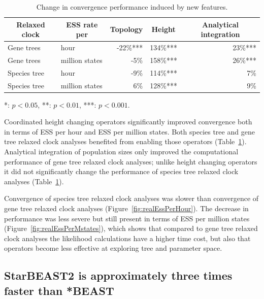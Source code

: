 \documentclass[12pt]{article}
\begin{document}
\begin{table}[htb!]
\centering
\caption{Change in convergence performance induced by new features.}
\label{tab:convergenceLM}
\begin{threeparttable}
\begin{adjustbox}{center}
\begin{tabular}{|l|l|r|r|r|}
\hline
\multicolumn{1}{|c|}{Relaxed clock} & \multicolumn{1}{c|}{ESS rate per} & \multicolumn{1}{c|}{Topology} & \multicolumn{1}{c|}{Height} & \multicolumn{1}{c|}{Analytical integration}\tabularnewline
\hline
Gene trees & hour & -22\%{***} & 134\%{***} & 23\%{***}\tabularnewline
\hline
Gene trees & million states & -5\%\hphantom{***} & 158\%{***} & 26\%{***}\tabularnewline
\hline
Species tree & hour & -9\%\hphantom{***} & 114\%{***} & 7\%\hphantom{***}\tabularnewline
\hline
Species tree & million states & 6\%\hphantom{***} & 128\%{***} & 9\%\hphantom{***}\tabularnewline
\hline
\end{tabular}
\end{adjustbox}
\begin{tablenotes}
\small
\item \hspace{1cm} {*}: $p < 0.05$, {**}: $p < 0.01$, {***}: $p < 0.001$.
\end{tablenotes}
\end{threeparttable}
\end{table}

Coordinated height changing operators significantly improved convergence both in
terms of ESS per hour and ESS per million states. Both species tree and gene
tree relaxed clock analyses benefited from enabling those operators
(Table~\ref{tab:convergenceLM}). Analytical integration of population sizes only
improved the computational performance of gene tree relaxed clock analyses;
unlike height changing operators it did not significantly change the performance
of species tree relaxed clock analyses (Table~\ref{tab:convergenceLM}).

Convergence of species tree relaxed clock analyses was slower than convergence
of gene tree relaxed clock analyses (Figure~\ref{fig:realEssPerHour}). The
decrease in performance was less severe but still present in terms of ESS per
million states (Figure~\ref{fig:realEssPerMstates}), which shows that compared
to gene tree relaxed clock analyses the likelihood calculations have a higher
time cost, but also that operators become less effective at exploring tree and
parameter space.

\subsection*{StarBEAST2 is approximately three times faster than *BEAST}
\end{document}
